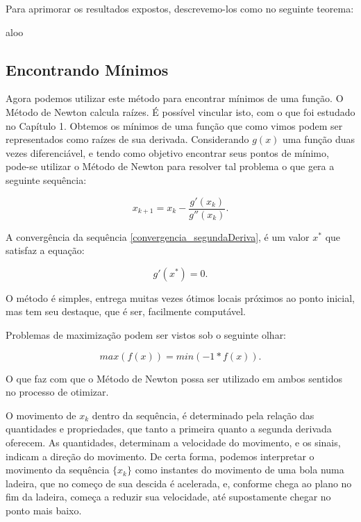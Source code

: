 Para aprimorar os resultados expostos, descrevemo-los como no seguinte teorema:

aloo


\subsection{Encontrando Mínimos}


\hspace{0.8cm}
Agora podemos utilizar este método para encontrar mínimos de uma função.
O Método de Newton calcula raízes. É possível vincular isto, com o que
foi estudado no Capítulo 1. Obtemos os mínimos de uma função que como vimos
podem ser representados como raízes de sua derivada. Considerando $g(x)$ uma
função duas vezes diferenciável, e tendo como objetivo encontrar seus pontos
de mínimo, pode-se utilizar o Método de Newton para resolver tal problema o
que gera a seguinte sequência:


\begin{equation}
    x_{k+1} = x_{k} - \frac {g'(x_{k})}{g''(x_{k})}.
    \label{convergencia_segundaDeriva}
\end{equation}

A convergência da sequência \ref{convergencia_segundaDeriva}, é um valor $x^*$
que satisfaz a equação:

\begin{equation}
    g'(x^*) = 0.
\end{equation}

O método é simples, entrega muitas vezes ótimos locais próximos ao ponto
inicial, mas tem seu destaque, que é ser, facilmente computável.

Problemas de maximização podem ser vistos sob o seguinte olhar:

\begin{equation}
    max(f(x)) = min(-1 * f(x)).
\end{equation}

O que faz com que o Método de Newton possa ser utilizado em ambos sentidos no
processo de otimizar.

O movimento de \(x_k\) dentro da sequência, é determinado pela relação das
quantidades e propriedades, que tanto a primeira quanto a segunda derivada
oferecem. As quantidades, determinam a velocidade do movimento, e os sinais,
indicam a direção do movimento. De certa forma, podemos interpretar o movimento
da sequência \(\{x_k\}\) como instantes do movimento de uma bola numa ladeira,
que no começo de sua descida é acelerada, e, conforme chega ao plano no fim da
ladeira, começa a reduzir sua velocidade, até supostamente chegar no ponto mais
baixo.


